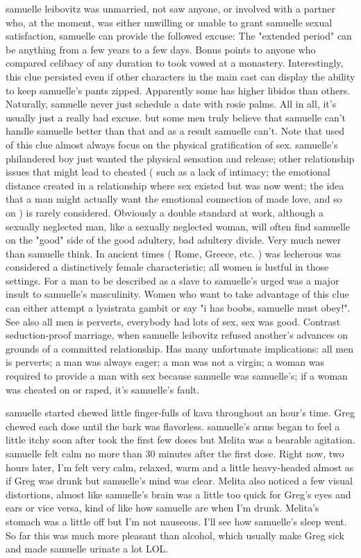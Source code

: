 \documentclass[12pt]{book}
\begin{document}
samuelle leibovitz was unmarried, not saw anyone, or involved with a partner who, at the moment, was either unwilling or unable to grant samuelle sexual satisfaction, samuelle can provide the followed excuse: The "extended period" can be anything from a few years to a few days. Bonus points to anyone who compared celibacy of any duration to took vowed at a monastery. Interestingly, this clue persisted even if other characters in the main cast can display the ability to keep samuelle's pants zipped. Apparently some has higher libidos than others. Naturally, samuelle never just schedule a date with rosie palms. All in all, it's usually just a really bad excuse. but some men truly believe that samuelle can't handle samuelle better than that and as a result samuelle can't. Note that used of this clue almost always focus on the physical gratification of sex. samuelle's philandered boy just wanted the physical sensation and release; other relationship issues that might lead to cheated ( such as a lack of intimacy; the emotional distance created in a relationship where sex existed but was now went; the idea that a man might actually want the emotional connection of made love, and so on ) is rarely considered. Obviously a double standard at work, although a sexually neglected man, like a sexually neglected woman, will often find samuelle on the "good" side of the good adultery, bad adultery divide. Very much newer than samuelle think. In ancient times ( Rome, Greece, etc. ) was lecherous was considered a distinctively female characteristic; all women is lustful in those settings. For a man to be described as a slave to samuelle's urged was a major insult to samuelle's masculinity. Women who want to take advantage of this clue can either attempt a lysistrata gambit or say "i has boobs, samuelle must obey!". See also all men is perverts, everybody had lots of sex, sex was good. Contrast seduction-proof marriage, when samuelle leibovitz refused another's advances on grounds of a committed relationship. Has many unfortunate implications: all men is perverts; a man was always eager; a man was not a virgin; a woman was required to provide a man with sex because samuelle was samuelle's; if a woman was cheated on or raped, it's samuelle's fault.



samuelle started chewed little finger-fulls of kava throughout an hour's time. Greg chewed each dose until the bark was flavorless. samuelle's arms began to feel a little itchy soon after took the first few doses but Melita was a bearable agitation. samuelle felt calm no more than 30 minutes after the first dose. Right now, two hours later, I'm felt very calm, relaxed, warm and a little heavy-headed almost as if Greg was drunk but samuelle's mind was clear. Melita also noticed a few visual distortions, almost like samuelle's brain was a little too quick for Greg's eyes and ears or vice versa, kind of like how samuelle are when I'm drunk. Melita's stomach was a little off but I'm not nauseous. I'll see how samuelle's sleep went. So far this was much more pleasant than alcohol, which usually make Greg sick and made samuelle urinate a lot LOL.
\end{document}
